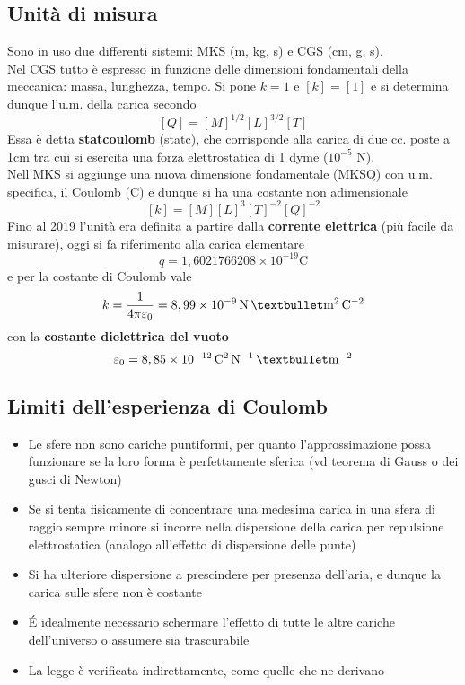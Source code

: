 \subsection{Unità di misura}
Sono in uso due differenti sistemi: MKS (m, kg, s) e CGS (cm, g, s).
\\Nel CGS tutto è espresso in funzione delle dimensioni fondamentali della meccanica: massa, lunghezza, tempo. Si pone $k = 1$ e $[k] = [1]$ e si determina dunque l'u.m. della carica secondo
\[[Q] = [M]^{1/2} [L]^{3/2} [T] \]
Essa è detta \textbf{statcoulomb} (statc), che corrisponde alla carica di due cc. poste a 1cm tra cui si esercita una forza elettrostatica di 1 dyme ($10^{-5}$ N).
\\Nell'MKS si aggiunge una nuova dimensione fondamentale (MKSQ) con u.m. specifica, il Coulomb (C) e dunque si ha una costante non adimensionale
\[[k] = [M] [L]^3 [T]^{-2} [Q]^{-2}\]
Fino al 2019 l'unità era definita a partire dalla \textbf{corrente elettrica} (più facile da misurare), oggi si fa riferimento alla carica elementare
\[q = 1,6021766208 \times 10^{-19} \mathrm{C}\]
e per la costante di Coulomb vale
\[k = \frac{1}{4 \pi \varepsilon_0} = 8,99 \times 10^{-9} \newton \meters{•}{2} \coulombs{}{-2}\]
con la \textbf{costante dielettrica del vuoto}
\[\varepsilon_0 = 8,85 \times 10^{-12} \coulombs{}{2} \newton^{-1} \meters{•}{-2}\]

\subsection{Limiti dell'esperienza di Coulomb}
\begin{itemize}
\item Le sfere non sono cariche puntiformi, per quanto l'approssimazione possa funzionare se la loro forma è perfettamente sferica (vd teorema di Gauss o dei gusci di Newton)
\item Se si tenta fisicamente di concentrare una medesima carica in una sfera di raggio sempre minore si incorre nella dispersione della carica per repulsione elettrostatica (analogo all'effetto di dispersione delle punte)
\item Si ha ulteriore dispersione a prescindere per presenza dell'aria, e dunque la carica sulle sfere non è costante
\item \'E idealmente necessario schermare l'effetto di tutte le altre cariche dell'universo o assumere sia trascurabile
\item La legge è verificata indirettamente, come quelle che ne derivano
\end{itemize}

